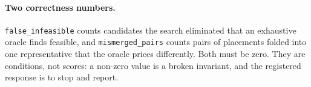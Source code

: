\paragraph{Two correctness numbers.}
\texttt{false\_infeasible} counts candidates the search eliminated that an
exhaustive oracle finds feasible, and \texttt{mismerged\_pairs} counts pairs of
placements folded into one representative that the oracle prices differently.
Both must be zero. They are conditions, not scores: a non-zero value is a
broken invariant, and the registered response is to stop and report.
